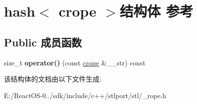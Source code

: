 \hypertarget{structhash_3_01crope_01_4}{}\section{hash$<$ crope $>$结构体 参考}
\label{structhash_3_01crope_01_4}
\subsection*{Public 成员函数}
\begin{DoxyCompactItemize}
\item 
\mbox{\label{structhash_3_01crope_01_4_adb2261b8dabebe52a22c21f0507dcd9e}} 
size\+\_\+t {\bfseries operator()} (const \hyperlink{classrope}{crope} \&\+\_\+\+\_\+str) const
\end{DoxyCompactItemize}


该结构体的文档由以下文件生成\+:\begin{DoxyCompactItemize}
\item 
E\+:/\+React\+O\+S-\/0../sdk/include/c++/stlport/stl/\+\_\+rope.\+h\end{DoxyCompactItemize}
